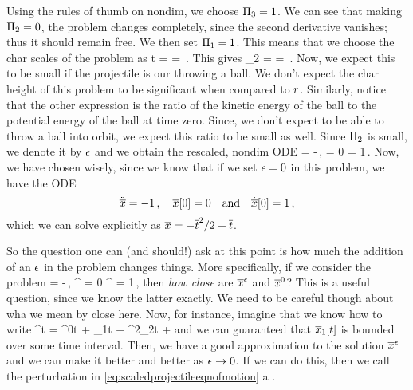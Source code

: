 Using the rules of thumb on nondim, we choose $\Pi_3 = 1$. We can see that making $\Pi_2 = 0$, the problem changes completely, since the second derivative vanishes; thus it should remain free. We then set $\Pi_1 = 1$. This means that we choose the char scales of the problem as
\beq
\chpq t = \qquad{}\qquad
\chpq\lpos = \,.
\eeq
This gives
\beq
\kdim_2 = \dfrac{\chpq\lpos}{\radius} = \,.
\eeq
Now, we expect this to be small if the projectile is our throwing a ball. We don't expect the char height of this problem to be significant when compared to $r$. Similarly, notice that the other expression is the ratio of the kinetic energy of the ball to the potential energy of the ball at time zero. Since, we don't expect to be able to throw a ball into orbit, we expect this ratio to be small as well. Since $\Pi_2$ is small, we denote it by $\epsilon$ and we obtain the rescaled, nondim ODE
\beq
\ddt{\scpq\lpos} = -\,,\quad
\scpq\lpos{} = 0\quad{}\quad
\dt{\scpq\lpos} = 1\,.
\eeq
Now, we have chosen wisely, since we know that if we set $\epsilon = 0$ in this problem, we have the ODE
\begin{equation}\label{eq:scaledprojectileeqnofmotion}
\ddot{\overline{x}} = -1\,,\quad
\overline{x}\!\left[{0}\right] = 0\quad\text{and}\quad
\dot{\overline{x}}\!\left[{0}\right] = 1\,,
\end{equation}
which we can solve explicitly as $\overline{x} = -\overline{t}^2/2 + \overline{t}$.

So the question one can (and should!) ask at this point is how much the addition of an $\epsilon$ in the problem changes things. More specifically, if we consider the problem
\beq
\ddt{\scpq\lpos^{\smpq}} = -\,,
\scpq\lpos^\smpq{} = 0\quad{}\quad
\dt{\scpq\lpos}^\smpq{} = 1\,,
\eeq
then \emph{how close} are $\overline{x}^\epsilon$ and $\overline{x}^0$? This is a useful question, since we know the latter exactly. We need to be careful though about wha we mean by close here. Now, for instance, imagine that we know how to write
\beq
\scpq\lpos^\smpq\vat t = \scpq\lpos^0\vat t + \smpq\scpq\lpos_1\vat t + \smpq^2\scpq\lpos_2\vat t + \dotsb
\eeq
and we can guaranteed that $\overline{x}_1\!\left[{t}\right]$ is bounded over some time interval. Then, we have a good approximation to the solution $\overline{x}^\epsilon$ and we can make it better and better as $\epsilon\to 0$. If we can do this, then we call the perturbation in \autoref{eq:scaledprojectileeqnofmotion} a .

